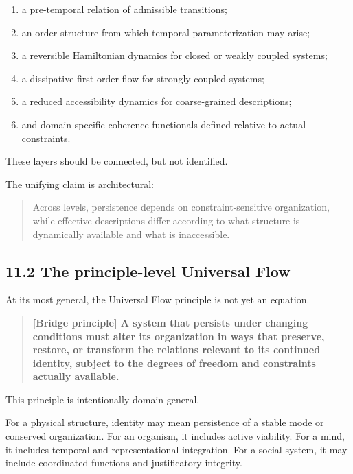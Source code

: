 \documentclass[
  11pt,
]{article}
\providecommand{\tightlist}{%
  \setlength{\itemsep}{0pt}\setlength{\parskip}{0pt}}
\begin{document}
\begin{enumerate}
\def\labelenumi{\arabic{enumi}.}
\tightlist
\item
  a pre-temporal relation of admissible transitions;
\item
  an order structure from which temporal parameterization may arise;
\item
  a reversible Hamiltonian dynamics for closed or weakly coupled
  systems;
\item
  a dissipative first-order flow for strongly coupled systems;
\item
  a reduced accessibility dynamics for coarse-grained descriptions;
\item
  and domain-specific coherence functionals defined relative to actual
  constraints.
\end{enumerate}

These layers should be connected, but not identified.

The unifying claim is architectural:

\begin{quote}
Across levels, persistence depends on constraint-sensitive organization,
while effective descriptions differ according to what structure is
dynamically available and what is inaccessible.
\end{quote}

\subsection{11.2 The principle-level Universal
Flow}\label{the-principle-level-universal-flow}

At its most general, the Universal Flow principle is not yet an
equation.

\begin{quote}
\textbf{{[}Bridge principle{]} A system that persists under changing
conditions must alter its organization in ways that preserve, restore,
or transform the relations relevant to its continued identity, subject
to the degrees of freedom and constraints actually available.}
\end{quote}

This principle is intentionally domain-general.

For a physical structure, identity may mean persistence of a stable mode
or conserved organization. For an organism, it includes active
viability. For a mind, it includes temporal and representational
integration. For a social system, it may include coordinated functions
and justificatory integrity.
\end{document}

